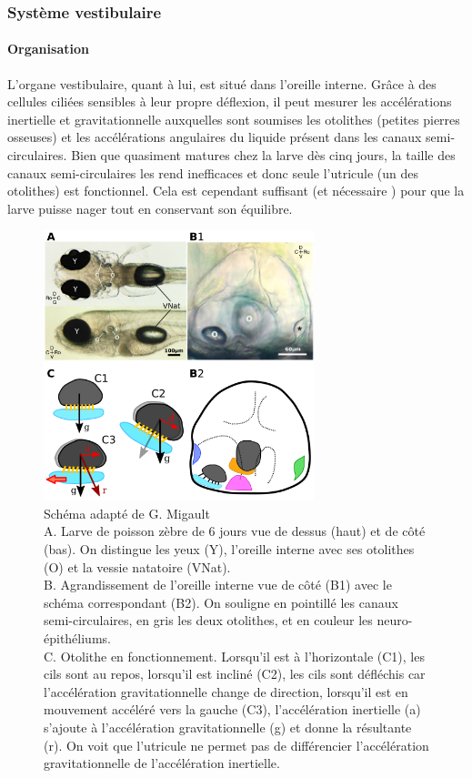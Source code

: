 \subsubsection{Système vestibulaire}

\paragraph{Organisation}
L'organe vestibulaire, quant à lui, est situé dans l'oreille interne. Grâce à des cellules ciliées sensibles à leur propre déflexion, il peut mesurer les accélérations inertielle et gravitationnelle auxquelles sont soumises les otolithes (petites pierres osseuses) et les accélérations angulaires du liquide présent dans les canaux semi-circulaires. Bien que quasiment matures chez la larve dès cinq jours, la taille des canaux semi-circulaires les rend inefficaces et donc seule l'utricule (un des otolithes) est fonctionnel. Cela est cependant suffisant (et nécessaire \cite{riley_development_2000}) pour que la larve puisse nager tout en conservant son équilibre.

\begin{figure}
\centering
\includegraphics[width=0.7\textwidth]{./files/appareil_vestibulaire.svg.png}
\caption{
Schéma adapté de G. Migault
\\
A. Larve de poisson zèbre de 6 jours vue de dessus (haut) et de côté (bas). On distingue les yeux (Y), l'oreille interne avec ses otolithes (O) et la vessie natatoire (VNat).
\\
B. Agrandissement de l'oreille interne vue de côté (B1) avec le schéma correspondant (B2). On souligne en pointillé les canaux semi-circulaires, en gris les deux otolithes, et en couleur les neuro-épithéliums.
\\
C. Otolithe en fonctionnement. Lorsqu'il est à l'horizontale (C1), les cils sont au repos, lorsqu'il est incliné (C2), les cils sont défléchis car l'accélération gravitationnelle change de direction, lorsqu'il est en mouvement accéléré vers la gauche (C3), l'accélération inertielle (a) s'ajoute à l'accélération gravitationnelle (g) et donne la résultante (r). On voit que l'utricule ne permet pas de différencier l'accélération gravitationnelle de l'accélération inertielle.}
\end{figure}


